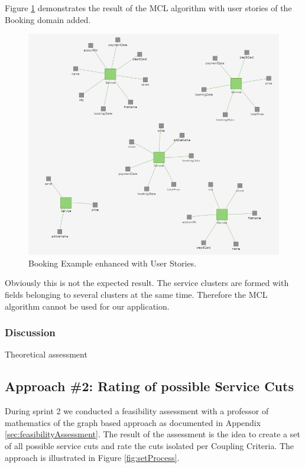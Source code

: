 Figure \ref{fig:clusteringBooking} demonstrates the result of the MCL algorithm with user stories of the Booking domain added. 

\begin{figure}[H]
	\begin{center}
		\includegraphics[scale=0.7]{images/booking_entities_mcl.png}
	\end{center}
	\caption{Booking Example enhanced with User Stories.}
	\label{fig:clusteringBooking}
\end{figure}

Obviously this is not the expected result. The service clusters are formed with fields belonging to several clusters at the same time. Therefore the MCL algorithm cannot be used for our application.


\subsubsection{Discussion}
Theoretical assessment %


\subsection{Approach \#2: Rating of possible Service Cuts}

During sprint 2 we conducted a feasibility assessment with a professor of mathematics of the graph based approach as documented in Appendix \ref{sec:feasibilityAssessment}. The result of the assessment is the idea to create a set of all possible service cuts and rate the cuts isolated per Coupling Criteria. The approach is illustrated in Figure \ref{fig:setProcess}.

